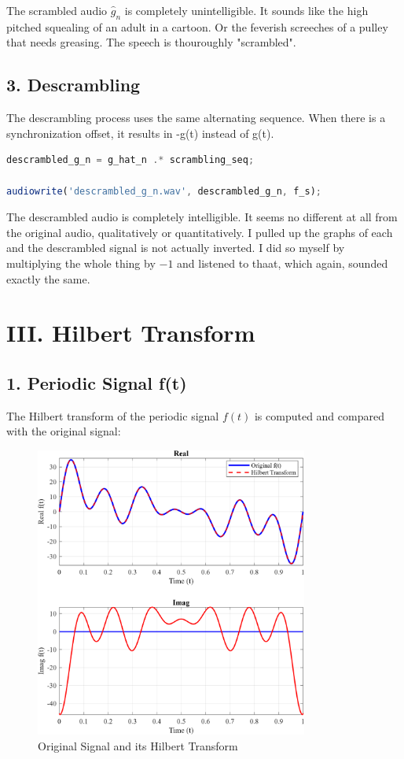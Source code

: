 \documentclass[12pt]{article}
\begin{document}
The scrambled audio $\hat{g}_n$ is completely unintelligible. It sounds like the high pitched squealing of an adult in a cartoon. Or the feverish screeches of a pulley that needs greasing. The speech is thouroughly "scrambled".


\newpage
\subsection*{3. Descrambling}
The descrambling process uses the same alternating sequence. When there is a synchronization offset, it results in -g(t) instead of g(t).

\begin{lstlisting}[language=Octave, caption=Descrambling]
descrambled_g_n = g_hat_n .* scrambling_seq;

audiowrite('descrambled_g_n.wav', descrambled_g_n, f_s);
\end{lstlisting}

The descrambled audio is completely intelligible. It seems no different at all from the original audio, qualitatively or quantitatively. I pulled up the graphs of each and the descrambled signal is not actually inverted. I did so myself by multiplying the whole thing by $-1$ and listened to thaat, which again, sounded exactly the same.

\newpage
\section*{III. Hilbert Transform}

\subsection*{1. Periodic Signal f(t)}
The Hilbert transform of the periodic signal $f(t)$ is computed and compared with the original signal:

\begin{figure}[H]
    \centering
    \includegraphics[width=0.8\textwidth]{f_t.png}
    \caption{Original Signal and its Hilbert Transform}
\end{figure}
\end{document}
